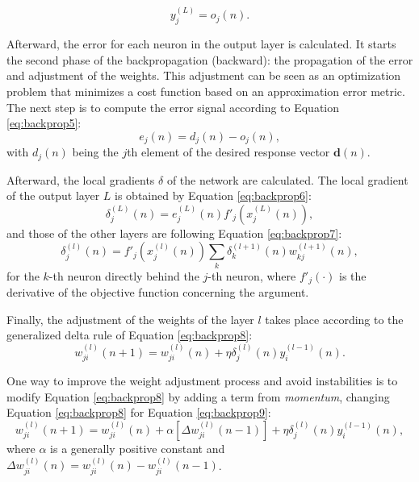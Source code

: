\begin{equation}
    \label{eq:backprop4}
    y_j^{(L)} = o_j (n).
\end{equation}

Afterward, the error for each neuron in the output layer is calculated. It starts the second phase of the backpropagation (backward): the propagation of the error and adjustment of the weights. This adjustment can be seen as an optimization problem that minimizes a cost function based on an approximation error metric. The next step is to compute the error signal according to Equation \ref{eq:backprop5}:
\begin{equation}
    \label{eq:backprop5}
    e_j (n) = d_j(n) - o_j (n),
\end{equation}
with $d_j (n)$ being the $j$th element of the desired response vector $\mathbf{d}(n)$.

Afterward, the local gradients $\delta$ of the network are calculated. The local gradient of the output layer $L$ is obtained by Equation \ref{eq:backprop6}:
\begin{equation}
    \label{eq:backprop6}
    \delta_j^{(L)} (n) = e_j^{(L)}(n) {f}'_j (x_j^{(L)}(n)),
\end{equation}
and those of the other layers are following Equation \ref{eq:backprop7}:
\begin{equation}
    \label{eq:backprop7}
    \delta_j^{(l)} (n) = {f}'_j (x_j^{(l)}(n)) \sum_k \delta_k^{(l+1)} (n) w_{kj}^{(l+1)}(n),
\end{equation}
for the $k$-th neuron directly behind the $j$-th neuron, where ${f}'_j(\cdot)$ is the derivative of the objective function concerning the argument.

Finally, the adjustment of the weights of the layer $l$ takes place according to the generalized delta rule of Equation \ref{eq:backprop8}:
\begin{equation}
    \label{eq:backprop8}
    w_{ji}^{(l)} (n+1) = w_{ji}^{(l)}(n) + \eta \delta_j^{(l)}(n) y_i^{(l-1)} (n).
\end{equation}

One way to improve the weight adjustment process and avoid instabilities is to modify Equation \ref{eq:backprop8} by adding a term from \textit{momentum}, changing Equation \ref{eq:backprop8} for Equation \ref{eq:backprop9}:
\begin{equation}
\label{eq:backprop9}
    w_{ji}^{(l)} (n+1) = w_{ji}^{(l)}(n) + \alpha[\Delta w_{ji}^{(l)}(n-1)] + \eta \delta_j^{(l)}(n) y_i^{(l-1)} (n),
\end{equation}
where $\alpha$ is a generally positive constant and $\Delta w_{ji}^{(l)}(n) = w_{ji}^{(l)}(n) - w_{ji}^{(l)}(n-1)$.

